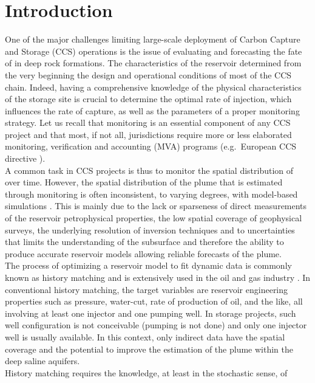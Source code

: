\section{Introduction}
One of the major challenges limiting large-scale deployment of Carbon Capture
and Storage (CCS) operations is the issue of evaluating and forecasting the fate
of  in deep rock formations. The characteristics of the reservoir
determined from the very beginning the design and operational conditions of most
of the CCS chain.  Indeed, having a comprehensive knowledge of the physical
characteristics of the storage site is crucial to determine the optimal rate of
 injection, which influences the rate of capture, as well as the
parameters of a proper monitoring strategy.  Let us recall that monitoring is an
essential component of any CCS project and that most, if not all, jurisdictions
require more or less elaborated monitoring, verification and accounting (MVA)
programs (e.g.\ European CCS directive \citep{EU2014}).\\
A common task in CCS projects is thus to monitor the spatial distribution of
 over time. However, the spatial distribution of the  plume that
is estimated through monitoring is often inconsistent, to varying degrees, with
model-based simulations \citep{Ramirez2013}. This is mainly due to the lack or
sparseness of direct measurements of the reservoir petrophysical properties,
the low spatial coverage of geophysical surveys,  the underlying resolution of
inversion techniques and to uncertainties that limits the understanding of the
subsurface and therefore the ability to produce accurate reservoir models
allowing reliable forecasts of the  plume.\\
The process of optimizing a reservoir model to fit dynamic data is commonly
known as history matching and is extensively used in the oil and gas industry \citep{Roggero1998}.
In conventional history matching, the target variables are reservoir engineering
properties such as pressure, water-cut, rate of production of oil, and the like,
all involving at least one injector and one pumping well. In  storage
projects, such well configuration is not conceivable (pumping is not done) and
only one injector well is usually available. In this context, only indirect data
have the spatial coverage and the potential to improve the estimation of the
 plume within the deep saline aquifers.\\
History matching requires the knowledge, at least in the stochastic sense, of
